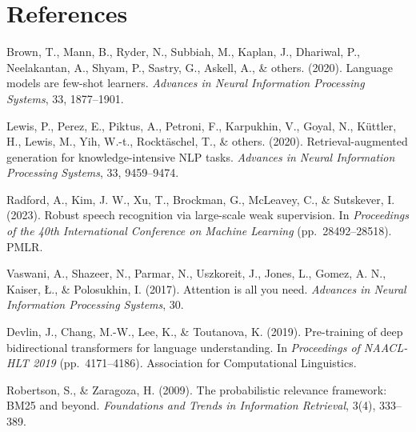 \documentclass[12pt,a4paper]{report}
\begin{document}
\newpage
\section*{References}

\begin{flushleft}

Brown, T., Mann, B., Ryder, N., Subbiah, M., Kaplan, J., Dhariwal, P.,
Neelakantan, A., Shyam, P., Sastry, G., Askell, A., \& others. (2020).
Language models are few-shot learners. \textit{Advances in Neural
Information Processing Systems}, 33, 1877--1901.

\vspace{0.5em}

Lewis, P., Perez, E., Piktus, A., Petroni, F., Karpukhin, V., Goyal, N.,
K{\"u}ttler, H., Lewis, M., Yih, W.-t., Rockt{\"a}schel, T., \& others.
(2020). Retrieval-augmented generation for knowledge-intensive NLP
tasks. \textit{Advances in Neural Information Processing Systems}, 33,
9459--9474.

\vspace{0.5em}

Radford, A., Kim, J. W., Xu, T., Brockman, G., McLeavey, C., \&
Sutskever, I. (2023). Robust speech recognition via large-scale weak
supervision. In \textit{Proceedings of the 40th International
Conference on Machine Learning} (pp.\ 28492--28518). PMLR.

\vspace{0.5em}

Vaswani, A., Shazeer, N., Parmar, N., Uszkoreit, J., Jones, L.,
Gomez, A. N., Kaiser, {\L}., \& Polosukhin, I. (2017). Attention is all
you need. \textit{Advances in Neural Information Processing Systems},
30.

\vspace{0.5em}

Devlin, J., Chang, M.-W., Lee, K., \& Toutanova, K. (2019). Pre-training
of deep bidirectional transformers for language understanding. In
\textit{Proceedings of NAACL-HLT 2019} (pp.\ 4171--4186). Association
for Computational Linguistics.

\vspace{0.5em}

Robertson, S., \& Zaragoza, H. (2009). The probabilistic relevance
framework: BM25 and beyond. \textit{Foundations and Trends in
Information Retrieval}, 3(4), 333--389.

\vspace{0.5em}


\end{flushleft}
\end{document}
